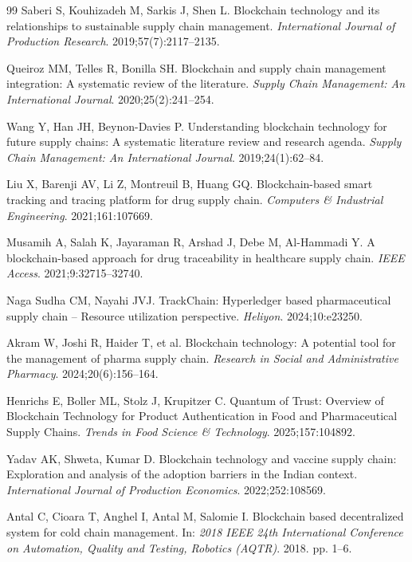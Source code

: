 \documentclass[pdflatex,sn-mathphys-num]{sn-jnl}
\theoremstyle{thmstyleone}
\theoremstyle{thmstyletwo}
\theoremstyle{thmstylethree}
\begin{document}
\begin{thebibliography}{99}
Saberi S, Kouhizadeh M, Sarkis J, Shen L. Blockchain technology and its relationships to sustainable supply chain management. \textit{International Journal of Production Research}. 2019;57(7):2117--2135.

Queiroz MM, Telles R, Bonilla SH. Blockchain and supply chain management integration: A systematic review of the literature. \textit{Supply Chain Management: An International Journal}. 2020;25(2):241--254.

Wang Y, Han JH, Beynon-Davies P. Understanding blockchain technology for future supply chains: A systematic literature review and research agenda. \textit{Supply Chain Management: An International Journal}. 2019;24(1):62--84.

Liu X, Barenji AV, Li Z, Montreuil B, Huang GQ. Blockchain-based smart tracking and tracing platform for drug supply chain. \textit{Computers \& Industrial Engineering}. 2021;161:107669.

Musamih A, Salah K, Jayaraman R, Arshad J, Debe M, Al-Hammadi Y. A blockchain-based approach for drug traceability in healthcare supply chain. \textit{IEEE Access}. 2021;9:32715--32740.

Naga Sudha CM, Nayahi JVJ. TrackChain: Hyperledger based pharmaceutical supply chain -- Resource utilization perspective. \textit{Heliyon}. 2024;10:e23250.

Akram W, Joshi R, Haider T, et al. Blockchain technology: A potential tool for the management of pharma supply chain. \textit{Research in Social and Administrative Pharmacy}. 2024;20(6):156--164.

Henrichs E, Boller ML, Stolz J, Krupitzer C. Quantum of Trust: Overview of Blockchain Technology for Product Authentication in Food and Pharmaceutical Supply Chains. \textit{Trends in Food Science \& Technology}. 2025;157:104892.

Yadav AK, Shweta, Kumar D. Blockchain technology and vaccine supply chain: Exploration and analysis of the adoption barriers in the Indian context. \textit{International Journal of Production Economics}. 2022;252:108569.

Antal C, Cioara T, Anghel I, Antal M, Salomie I. Blockchain based decentralized system for cold chain management. In: \textit{2018 IEEE 24th International Conference on Automation, Quality and Testing, Robotics (AQTR)}. 2018. pp. 1--6.


\end{thebibliography}
\end{document}
